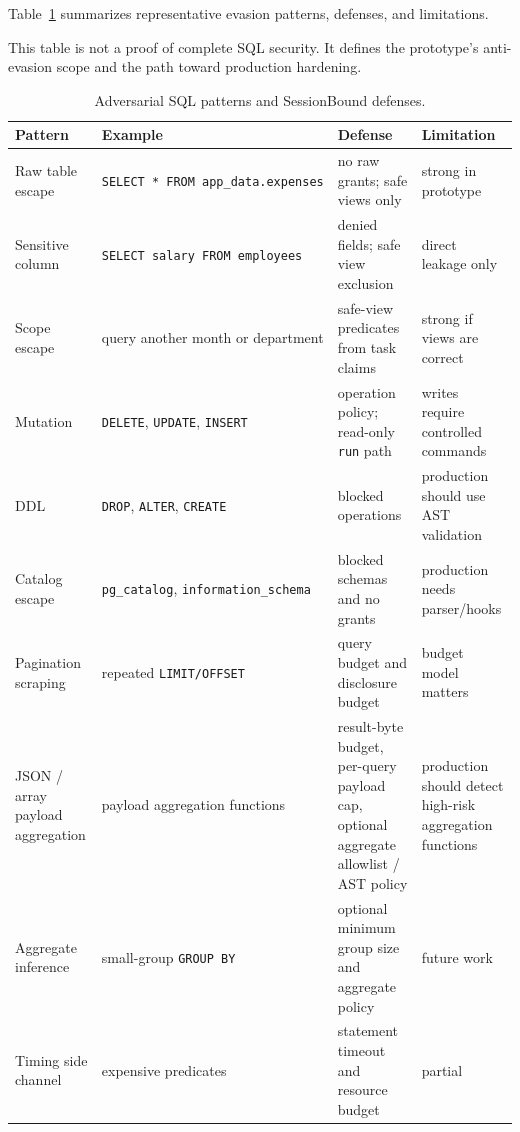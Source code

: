 \documentclass[journal]{IEEEtran}
\begin{document}
Table~\ref{tab:anti-evasion} summarizes representative evasion
patterns, defenses, and limitations.

This table is not a proof of complete SQL security. It defines the
prototype's anti-evasion scope and the path toward production hardening.

\begin{table}[!t]
\centering
\scriptsize
\setlength{\tabcolsep}{3pt}
\caption{Adversarial SQL patterns and SessionBound defenses.}
\label{tab:anti-evasion}
\begin{tabular}{@{}
  >{\raggedright\arraybackslash}p{}
  >{\raggedright\arraybackslash}p{}
  >{\raggedright\arraybackslash}p{}
  >{\raggedright\arraybackslash}p{}@{}}
\toprule
Pattern & Example & Defense & Limitation \\
\midrule
Raw table escape & \texttt{SELECT\ *\ FROM\ app\_data.expenses} & no raw
grants; safe views only & strong in prototype \\
Sensitive column & \texttt{SELECT\ salary\ FROM\ employees} & denied
fields; safe view exclusion & direct leakage only \\
Scope escape & query another month or department & safe-view predicates
from task claims & strong if views are correct \\
Mutation & \texttt{DELETE}, \texttt{UPDATE}, \texttt{INSERT} & operation
policy; read-only \texttt{run} path & writes require controlled
commands \\
DDL & \texttt{DROP}, \texttt{ALTER}, \texttt{CREATE} & blocked
operations & production should use AST validation \\
Catalog escape & \texttt{pg\_catalog}, \texttt{information\_schema} &
blocked schemas and no grants & production needs parser/hooks \\
Pagination scraping & repeated \texttt{LIMIT/OFFSET} & query budget and
disclosure budget & budget model matters \\
JSON / array payload aggregation & payload aggregation functions &
result-byte budget, per-query payload cap, optional aggregate allowlist
/ AST policy & production should detect high-risk aggregation
functions \\
Aggregate inference & small-group \texttt{GROUP\ BY} & optional minimum
group size and aggregate policy & future work \\
Timing side channel & expensive predicates & statement timeout and
resource budget & partial \\
\bottomrule
\end{tabular}
\end{table}
\end{document}
